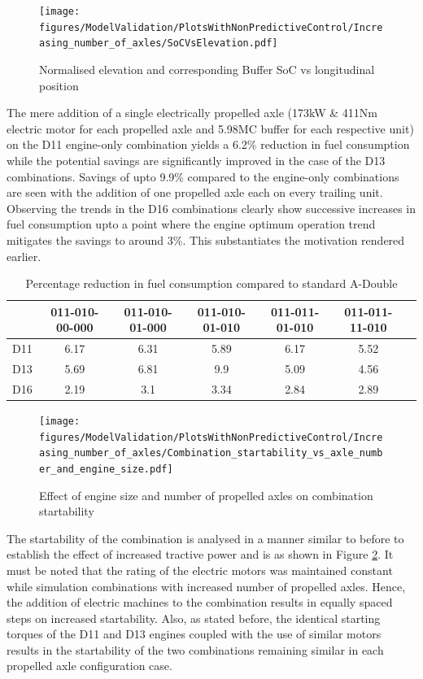 \documentclass[ExampleMasters.tex]{subfiles}
\begin{document}
\begin{figure}[h!]
\texttt{[image: figures/ModelValidation/PlotsWithNonPredictiveControl/Increasing\_number\_of\_axles/SoCVsElevation.pdf]}
\caption{Normalised elevation and corresponding Buffer SoC vs longitudinal position}
\label{SoCVsPosition}
\end{figure}

The mere addition of a single electrically propelled axle (173kW \& 411Nm electric motor for each propelled axle and 5.98MC buffer for each respective unit) on the D11 engine-only combination yields a 6.2\% reduction in fuel consumption while the potential savings are significantly improved in the case of the D13 combinations. Savings of upto 9.9\% compared to the engine-only combinations are seen with the addition of one propelled axle each on every trailing unit. Observing the trends in the D16 combinations clearly show successive increases in fuel consumption upto a point where the engine optimum operation trend mitigates the savings to around 3\%. This substantiates the motivation rendered earlier.\\

\begin{table}[h!]
\centering
\begin{tabular}{|c|c|c|c|c|c|c|}
\hline
& 011-010-00-000 & 011-010-01-000 & 011-010-01-010 & 011-011-01-010 & 011-011-11-010 \\
\hline
D11 & 6.17 & 6.31 & 5.89 & 6.17 & 5.52 \\
\hline
D13 & 5.69 & 6.81 & 9.9 & 5.09 & 4.56 \\
\hline
D16 & 2.19 & 3.1 & 3.34 & 2.84 & 2.89 \\
\hline
\end{tabular}
\caption{Percentage reduction in fuel consumption compared to standard A-Double}
\label{table:fuelConsumptionReductionAxles}
\end{table}

\begin{figure}[h!]
\centering
\texttt{[image: figures/ModelValidation/PlotsWithNonPredictiveControl/Increasing\_number\_of\_axles/Combination\_startability\_vs\_axle\_number\_and\_engine\_size.pdf]}
\caption{Effect of engine size and number of propelled axles on combination startability}
\label{startabilityEngineNumberOfAxles}
\end{figure}

The startability of the combination is analysed in a manner similar to before to establish the effect of increased tractive power and is as shown in Figure \ref{startabilityEngineNumberOfAxles}. It must be noted that the rating of the electric motors was maintained constant while simulation combinations with increased number of propelled axles. Hence, the addition of electric machines to the combination results in equally spaced steps on increased startability. Also, as stated before, the identical starting torques of the D11 and D13 engines coupled with the use of similar motors results in the startability of the two combinations remaining similar in each propelled axle configuration case.\\
\end{document}
